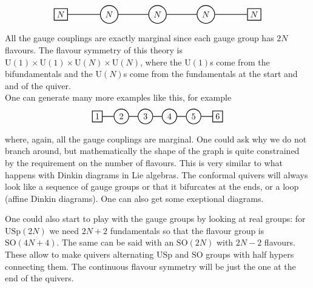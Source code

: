\documentclass[11pt]{article}
\theoremstyle{definition}
\numberwithin{equation}{section}
\newcommand*\U{\mathrm{U}}
\newcommand*\SO{\mathrm{SO}}
\newcommand*\USp{\mathrm{USp}}
\begin{document}
\begin{equation}
\begin{tikzpicture}[thick]
  \node[circle,draw] (one) at (0,0) {$N$};
  \node[circle,draw]  (two) at (2,0) {$N$};
  \node[circle,draw]  (three) at (4,0) {$N$};
  \node[rectangle,draw]  (flav1) at (-2,0) {$N$};
  \node[rectangle,draw]  (flav2) at (6,0) {$N$};
  \draw[-](one)--(two);
  \draw[-](two)--(three);
  \draw[-](one)--(flav1);
  \draw[-](flav2)--(three);
\end{tikzpicture}
\end{equation}
All the gauge couplings are exactly marginal since each gauge group has $2N$ flavours. The flavour symmetry of this theory is $\U(1)\times\U(1)\times\U(N)\times\U(N)$, where the $\U(1)$s come from the bifundamentals and the $\U(N)$s come from the fundamentals at the start and and of the quiver.\\
One can generate many more examples like this, for example
\begin{equation}
\begin{tikzpicture}[thick]
  \node[circle,draw] (one) at (0,0) {$2$};
  \node[circle,draw]  (two) at (1,0) {$3$};
  \node[circle,draw]  (three) at (2,0) {$4$};
  \node[circle,draw]  (four) at (3,0) {$5$};
  \node[rectangle,draw]  (flav1) at (-1,0) {$1$};
  \node[rectangle,draw]  (flav2) at (4,0) {$6$};
  \draw[-](one)--(two);
  \draw[-](two)--(three);
  \draw[-](three)--(four);
  \draw[-](one)--(flav1);
  \draw[-](flav2)--(four);
\end{tikzpicture}
\end{equation}
where, again, all the gauge couplings are marginal. One could ask why we do not branch around, but mathematically the shape of the graph is quite constrained by the requirement on the number of flavours. This is very similar to what happens with Dinkin diagrams in Lie algebras. The conformal quivers will always look like a sequence of gauge groups or that it bifurcates at the ends, or a loop (affine Dinkin diagrams). One can also get some exeptional diagrams.

One could also start to play with the gauge groups by looking at real groups: for $\USp(2N)$ we need $2N+2$ fundamentals so that the flavour group is $\SO(4N+4)$. The same can be said with an $\SO(2N)$ with $2N-2$ flavours. These allow to make quivers alternating $\USp$ and $\SO$ groups with half hypers connecting them. The continuous flavour symmetry will be just the one at the end of the quivers.
\end{document}
